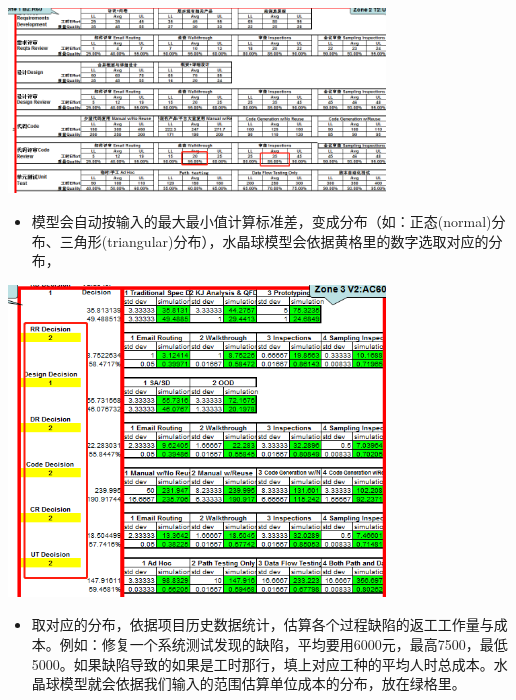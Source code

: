 
\includegraphics[width=10cm]{微信截图_20211027011246.png}

\begin{itemize}
\tightlist
\item
  模型会自动按输入的最大最小值计算标准差，变成分布（如：正态(normal)分布、三角形(triangular)分布），水晶球模型会依据黄格里的数字选取对应的分布，
\end{itemize}


\includegraphics[width=10cm]{微信截图_20211027011403.png}

\begin{itemize}
\tightlist
\item
  取对应的分布，依据项目历史数据统计，估算各个过程缺陷的返工工作量与成本。例如：修复一个系统测试发现的缺陷，平均要用6000元，最高7500，最低5000。如果缺陷导致的如果是工时那行，填上对应工种的平均人时总成本。水晶球模型就会依据我们输入的范围估算单位成本的分布，放在绿格里。
\end{itemize}


